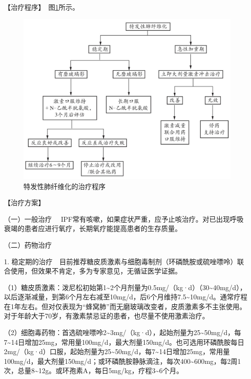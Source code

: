 【治疗程序】　图\ref{fig1-14-1}所示。

\begin{figure}[!htbp]
 \centering
 \includegraphics{./images/Image00029.jpg}
 \captionsetup{justification=centering}
 \caption{特发性肺纤维化的治疗程序}
 \label{fig1-14-1}
  \end{figure} 

【治疗方案】

{（一）一般治疗}
　IPF常有咳嗽，如果症状严重，应予止咳治疗。对已出现呼吸衰竭的患者应进行氧疗，长期氧疗能提高患者的生存质量。

{（二）药物治疗}

1.
稳定期的治疗　目前推荐糖皮质激素与细胞毒制剂（环磷酰胺或硫唑嘌呤）联合使用，但效果不肯定，多为专家意见，无循证医学证据。

（1）糖皮质激素：泼尼松初始第1\textasciitilde{}2个月剂量为0.5mg/（kg·d）（30\textasciitilde{}40mg/d），以后逐渐减量，到第6个月左右减至10mg/d，后6个月维持7.5\textasciitilde{}10mg/d。通常疗程在1年左右。但对仅表现为“蜂窝肺”而无磨玻璃改变者，皮质激素多不主张使用。对于年龄大于70岁，有激素禁忌证的患者，也尽量不使用激素治疗。

（2）细胞毒药物：首选硫唑嘌呤2\textasciitilde{}3mg/（kg·d），起始剂量为25\textasciitilde{}50mg/d，每7\textasciitilde{}14日增加25mg，常用量100mg/d，最大剂量150mg/d。也可选用环磷酰胺每日2mg/（kg·d）口服，起始剂量为25\textasciitilde{}50mg/d，每7\textasciitilde{}14日增加25mg，常用量100mg/d，最大剂量150mg/d；或环磷酰胺静脉滴注，每次400\textasciitilde{}600mg，每2周1次，总量8\textasciitilde{}12g。或环孢素A，每日5mg/kg，疗程3\textasciitilde{}6个月。

